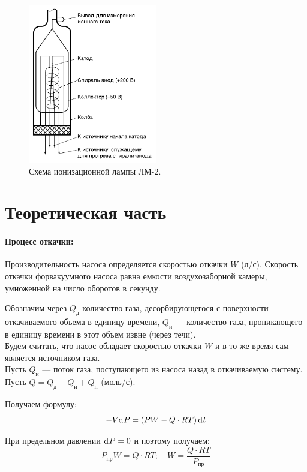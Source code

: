 \documentclass[a4paper,12pt]{article}
\begin{document}
\begin{figure}[H]
  \centering
  \includegraphics[width=0.5\textwidth]{6.png}
  \caption{Схема ионизационной лампы ЛМ-2.\label{fig:схема_ионизационной_лампы}}
\end{figure}

\section{Теоретическая часть}

\paragraph{Процесс откачки: }
Производительность насоса определяется скоростью откачки $W$ (л/с). Скорость откачки форвакуумного насоса равна емкости воздухозаборной камеры, умноженной на число оборотов в секунду.

Обозначим через $Q_\text{д}$ количество газа, десорбирующегося с поверхности откачиваемого объема в единицу времени,
$Q_\text{и}$ --- количество газа, проникающего в единицу времени в этот объем извне (через течи). \\
Будем считать, что насос обладает скоростью откачки $W$ и в то же время сам является источником газа. \\
Пусть $Q_\text{н}$ — поток газа, поступающего из насоса назад в откачиваемую систему. \\
Пусть $Q=Q_\text{д} + Q_\text{и} + Q_\text{н}$ (моль/с).

Получаем формулу:
\begin{equation}
  -V\d{P}=\left(P W - Q \cdot RT\right)\d{t}
\end{equation}

При предельном давлении $\d{P}=0$ и поэтому получаем:
\begin{equation}
  P_\text{пр} W = Q \cdot RT; \quad
  W = \frac{Q \cdot RT}{P_\text{пр}}
\end{equation}
\end{document}
